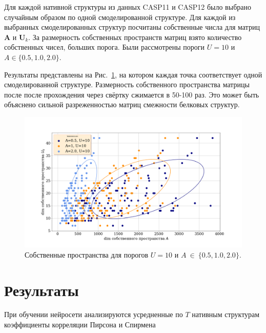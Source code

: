 \documentclass[14pt]{extarticle}
\begin{document}
Для каждой нативной структуры из данных CASP11 и CASP12 было выбрано случайным образом по одной смоделированной структуре. Для каждой из выбранных смоделированных структур посчитаны собственные числа для матриц $\textbf{A}$ и $\textbf{U}_k$. За размерность собственных пространств матриц взято количество собственных чисел, больших порога. Были рассмотрены пороги $U=10$ и $A \in \{0.5, 1.0, 2.0\}$. 

Результаты представлены на Рис.~\ref{eigens_dims}, на котором каждая точка соответствует одной смоделированной структуре. Размерность собственного пространства матрицы после после прохождения через свёртку сжимается в 50-100 раз. Это может быть объяснено сильной разреженностью матриц смежности белковых структур.

\begin{figure}[H]
	\centering
	\includegraphics[width=1.05\textwidth]{eigens.png}
	\caption{Собственные пространства для порогов $U=10$ и $A~\in~\{0.5, 1.0, 2.0\}$.}
	\label{eigens_dims}
\end{figure}


\section{Результаты}
При обучении нейросети анализируются усредненные по $T$ нативным структурам коэффициенты корреляции Пирсона и Спирмена
\end{document}
